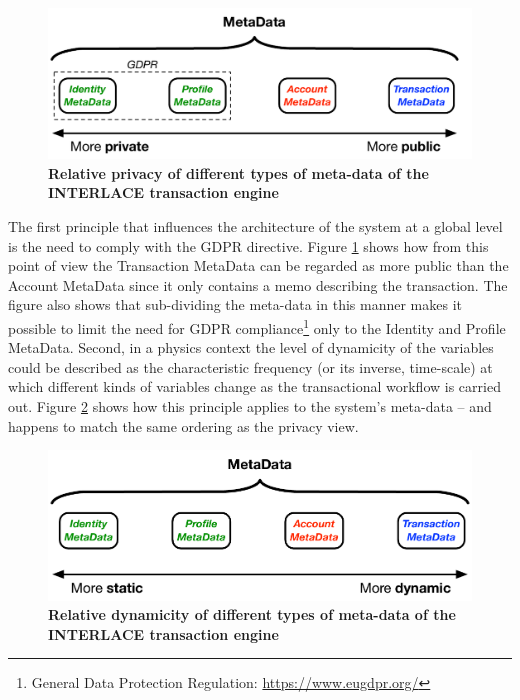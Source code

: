 \begin{figure}[h]
\vspace{-0.5cm}
\centering
\includegraphics[width=12cm]{Figures/Private_Public_MetaData}
\caption{\small\textbf{Relative privacy of different types of meta-data of the INTERLACE transaction engine}}
\label{fig:privatepublicmetaData}
\vspace{-0.5cm}
\end{figure}

The first principle that influences the architecture of the system at a global level is the need to comply with the GDPR directive. Figure \ref{fig:privatepublicmetaData} shows how from this point of view the Transaction MetaData can be regarded as more public than the Account MetaData since it only contains a memo describing the transaction. The figure also shows that sub-dividing the meta-data in this manner makes it possible to limit the need for GDPR compliance\footnote{General Data Protection Regulation: \url{https://www.eugdpr.org/}} only to the Identity and Profile MetaData. Second, in a physics context the level of dynamicity of the variables could be described as the characteristic frequency (or its inverse, time-scale) at which different kinds of variables change as the transactional workflow is carried out. Figure \ref{fig:staticdynamicmetadata} shows how this principle applies to the system's meta-data -- and happens to match the same ordering as the privacy view.

\begin{figure}[h]
\vspace{-0.5cm}
\centering
\includegraphics[width=12cm]{Figures/Static_Dynamic_MetaData}
\caption{\small\textbf{Relative dynamicity of different types of meta-data of the INTERLACE transaction engine}}
\label{fig:staticdynamicmetadata}
\vspace{-0.5cm}
\end{figure}

